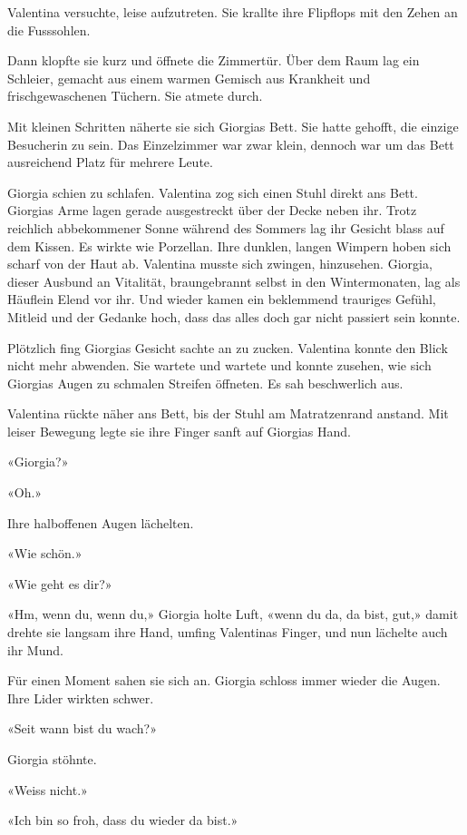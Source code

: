 Valentina versuchte, leise aufzutreten. Sie krallte ihre Flipflops mit
den Zehen an die Fusssohlen.

Dann klopfte sie kurz und öffnete die Zimmertür. Über dem Raum lag ein
Schleier, gemacht aus einem warmen Gemisch aus Krankheit und
frischgewaschenen Tüchern. Sie atmete durch.

Mit kleinen Schritten näherte sie sich Giorgias Bett. Sie hatte gehofft,
die einzige Besucherin zu sein. Das Einzelzimmer war zwar klein, dennoch
war um das Bett ausreichend Platz für mehrere Leute.

Giorgia schien zu schlafen. Valentina zog sich einen Stuhl direkt ans
Bett. Giorgias Arme lagen gerade ausgestreckt über der Decke neben ihr.
Trotz reichlich abbekommener Sonne während des Sommers lag ihr Gesicht
blass auf dem Kissen. Es wirkte wie Porzellan. Ihre dunklen, langen
Wimpern hoben sich scharf von der Haut ab. Valentina musste sich
zwingen, hinzusehen. Giorgia, dieser Ausbund an Vitalität, braungebrannt
selbst in den Wintermonaten, lag als Häuflein Elend vor ihr. Und wieder
kamen ein beklemmend trauriges Gefühl, Mitleid und der Gedanke hoch,
dass das alles doch gar nicht passiert sein konnte.

Plötzlich fing Giorgias Gesicht sachte an zu zucken. Valentina konnte
den Blick nicht mehr abwenden. Sie wartete und wartete und konnte
zusehen, wie sich Giorgias Augen zu schmalen Streifen öffneten. Es sah
beschwerlich aus.

Valentina rückte näher ans Bett, bis der Stuhl am Matratzenrand anstand.
Mit leiser Bewegung legte sie ihre Finger sanft auf Giorgias Hand.

«Giorgia?»

«Oh.»

Ihre halboffenen Augen lächelten.

«Wie schön.»

«Wie geht es dir?»

«Hm, wenn du, wenn du,» Giorgia holte Luft, «wenn du da, da bist, gut,»
damit drehte sie langsam ihre Hand, umfing Valentinas Finger, und nun
lächelte auch ihr Mund.

Für einen Moment sahen sie sich an. Giorgia schloss immer wieder die
Augen. Ihre Lider wirkten schwer.

«Seit wann bist du wach?»

Giorgia stöhnte.

«Weiss nicht.»

«Ich bin so froh, dass du wieder da bist.»

